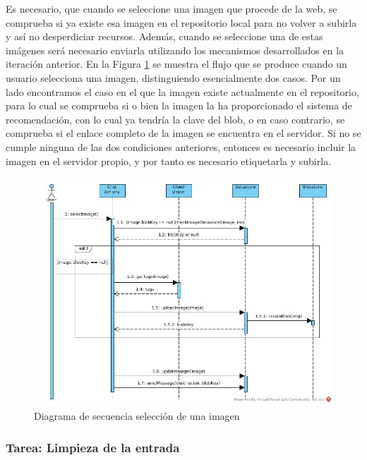 Es necesario, que cuando se seleccione una imagen que procede de la web, se comprueba si ya existe esa imagen en el repositorio local para no volver a subirla y así no desperdiciar recursos. Además, cuando se seleccione una de estas imágenes será necesario enviarla utilizando los mecanismos desarrollados en la iteración anterior. En la Figura \ref{fig:ImageSelected} se muestra el flujo que se produce cuando un usuario selecciona una imagen, distinguiendo esencialmente dos casos. Por un lado encontramos el caso en el que la imagen existe actualmente en el repositorio, para lo cual se comprueba si o bien la imagen la ha proporcionado el sistema de recomendación, con lo cual ya tendría la clave del blob, o en caso contrario, se comprueba si el enlace completo de la imagen se encuentra en el servidor. Si no se cumple ninguna de las dos condiciones anteriores, entonces es necesario incluir la imagen en el servidor propio, y por tanto es necesario etiquetarla y subirla.

\begin{figure}[!h]
\begin{center}
\includegraphics[width=1.1\textwidth]{./figures/ImageSelected.jpg}
\caption{Diagrama de secuencia selección de una imagen}
\label{fig:ImageSelected}
\end{center}
\end{figure}

 
\subsubsection{Tarea: Limpieza de la entrada}

